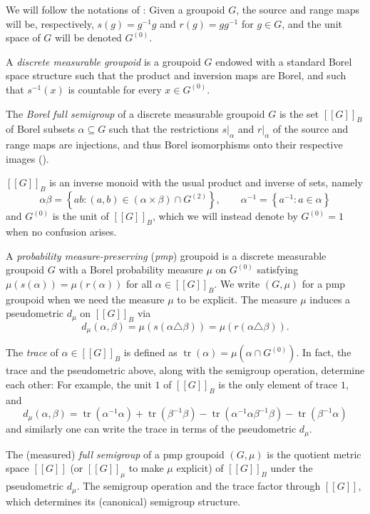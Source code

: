 \documentclass[11pt]{amsart}
\theoremstyle{plain}    \newtheorem{theorem}[generalnumbering]{Theorem}
\theoremstyle{plain}    \newtheorem{corollary}[generalnumbering]{Corollary}
\theoremstyle{definition}   \newtheorem{definition}[generalnumbering]{Definition}
\theoremstyle{definition}   \newtheorem{example}[generalnumbering]{Example}
\theoremstyle{plain}    \newtheorem{proposition}[generalnumbering]{Proposition}
\theoremstyle{plain}    \newtheorem{lemma}[generalnumbering]{Lemma}
\theoremstyle{plain}    \newtheorem{plainstyle}[generalnumbering]{\namefordifferentenvironment}
\theoremstyle{plain}    \newtheorem*{plainstyle*}{\namefordifferentenvironment}
\theoremstyle{definition}    \newtheorem{definitionstyle}[generalnumbering]{\namefordifferentenvironment}
\theoremstyle{definition}    \newtheorem*{definitionstyle*}{\namefordifferentenvironment}
\begin{document}
We will follow the notations of \cite{MR3130315}: Given a groupoid $G$, the source and range maps will be, respectively, $s(g)=g^{-1}g$ and $r(g)=gg^{-1}$ for $g\in G$, and the unit space of $G$ will be denoted $G^{(0)}$.

A \emph{discrete measurable groupoid} is a groupoid $G$ endowed with a standard Borel space structure such that the product and inversion maps are Borel, and such that $s^{-1}(x)$ is countable for every $x\in G^{(0)}$.

The \emph{Borel full semigroup} of a discrete measurable groupoid $G$ is the set $[[G]]_B$ of Borel subsets $\alpha\subseteq G$ such that the restrictions $s|_\alpha$ and $r|_\alpha$ of the source and range maps are injections, and thus Borel isomorphisms onto their respective images (\cite[Theorem 15.2]{MR1321597}).%

$[[G]]_B$ is an inverse monoid with the usual product and inverse of sets, namely
\[\alpha\beta=\left\{ab:(a,b)\in (\alpha\times\beta)\cap G^{(2)}\right\},\qquad \alpha^{-1}=\left\{a^{-1}:a\in\alpha\right\}\]
and $G^{(0)}$ is the unit of $[[G]]_B$, which we will instead denote by $G^{(0)}=1$ when no confusion arises.

A \emph{probability measure-preserving} (\emph{pmp}) groupoid is a discrete measurable grou\-poid $G$ with a Borel probability measure $\mu$ on $G^{(0)}$ satisfying $\mu(s(\alpha))=\mu(r(\alpha))$ for all $\alpha\in[[G]]_B$. We write $(G,\mu)$ for a pmp groupoid when we need the measure $\mu$ to be explicit. The measure $\mu$ induces a pseudometric $d_{\mu}$ on $[[G]]_B$ via
\[d_{\mu}(\alpha,\beta)=\mu(s(\alpha\triangle\beta))=\mu(r(\alpha\triangle\beta)).\]

The \emph{trace} of $\alpha\in[[G]]_B$ is defined as $\operatorname{tr}(\alpha)=\mu(\alpha\cap G^{(0)})$. In fact, the trace and the pseudometric above, along with the semigroup operation, determine each other: For example, the unit $1$ of $[[G]]_B$ is the only element of trace $1$, and
\[d_\mu(\alpha,\beta)=\operatorname{tr}(\alpha^{-1}\alpha)+\operatorname{tr}(\beta^{-1}\beta)-\operatorname{tr}(\alpha^{-1}\alpha\beta^{-1}\beta)-\operatorname{tr}(\beta^{-1}\alpha)\]
and similarly one can write the trace in terms of the pseudometric $d_\mu$.

The (measured) \emph{full semigroup} of a pmp groupoid $(G,\mu)$ is the quotient metric space $[[G]]$ (or $[[G]]_\mu$ to make $\mu$ explicit) of $[[G]]_B$ under the pseudometric $d_\mu$. The semigroup operation and the trace factor through $[[G]]$, which determines its (canonical) semigroup structure.
\end{document}
